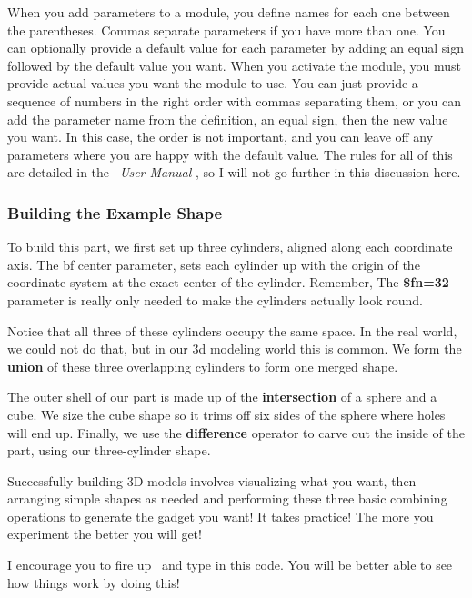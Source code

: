 When you add parameters to a module, you define names for each one between the
parentheses. Commas separate parameters if you have more than one. You can
optionally provide a default value for each parameter by adding an equal sign
followed by the default value you want. When you activate the module, you must
provide actual values you want the module to use. You can just provide a
sequence of numbers in the right order with commas separating them, or you can
add the parameter name from the definition, an equal sign, then the new value
you want. In this case, the order is not important, and you can leave off any
parameters where you are happy with the default value.  The rules for all of
this are detailed in the \osc\ {\it User Manual} \cite{userman}, so I will
not go further in this discussion here.

\subsubsection*{Building the Example Shape}

To build this part, we first set up three cylinders, aligned along each
coordinate axis. The {bf center} parameter, sets each cylinder up with the
origin of the coordinate system at the exact center of the cylinder. Remember, The {\bf
\$fn=32} parameter is really only needed to make the cylinders actually look
round.

Notice that all three of these cylinders occupy the same space. In the real
world, we could not do that, but in our 3d modeling world this is common. We form
the {\bf union} of these three overlapping cylinders to form one merged shape.

The outer shell of our part is made up of the {\bf intersection} of a sphere
and a cube. We size the cube shape so it trims off six sides of the sphere
where holes will end up.  Finally, we use the {\bf difference} operator to
carve out the inside of the part, using our three-cylinder shape.

Successfully building 3D models involves visualizing what you want, then
arranging simple shapes as needed and performing these three basic combining
operations to generate the gadget you want! It takes practice! The more you
experiment the better you will get!

I encourage you to fire up \osc\ and type in this code. You will be better
able to see how things work by doing this!
